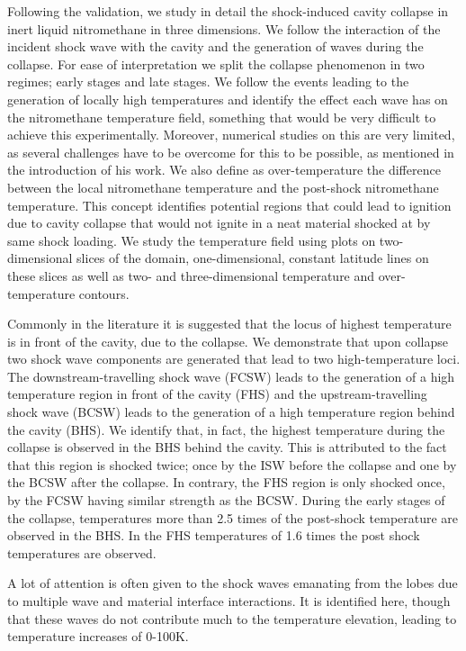 \documentclass[3p,times,twocolumn]{elsarticle}
\begin{document}
Following the validation, we study in detail the shock-induced cavity collapse in inert liquid nitromethane in three dimensions.  We follow the interaction of the incident shock wave with the cavity and the generation of waves during the collapse. For ease of interpretation we split the collapse phenomenon in two regimes; early stages and late stages. We follow the events leading to the generation of locally high temperatures and identify the effect each wave has on the nitromethane temperature field, something that would be very difficult to achieve this experimentally. Moreover, numerical studies on this are very limited, as several challenges have to be overcome for this to be possible, as mentioned in the introduction of his work. We also define as over-temperature the difference between the local nitromethane temperature and the post-shock nitromethane temperature. This concept identifies potential regions that could lead to ignition due to cavity collapse that would not ignite in a neat material shocked at by same shock loading. We study the temperature field using plots on two-dimensional slices of the domain, one-dimensional, constant latitude lines on these slices as well as two- and three-dimensional temperature and over-temperature contours.

Commonly in the literature it is suggested that the locus of highest temperature is in front of the cavity, due to the collapse. We demonstrate that upon collapse two shock wave components are generated that lead to two high-temperature loci. The downstream-travelling shock wave (FCSW) leads to the generation of a high temperature region in front of the cavity (FHS) and the upstream-travelling shock wave (BCSW) leads to the generation of a high temperature region behind the cavity (BHS). We identify that, in fact, the highest temperature during the collapse is observed in the BHS behind the cavity. This is attributed to the fact that this region is shocked twice; once by the ISW before the collapse and one by the BCSW after the collapse. In contrary, the FHS region is only shocked once, by the FCSW having similar strength as the BCSW. During the early stages of the collapse, temperatures more than 2.5 times of the post-shock temperature are observed in the BHS. In the FHS temperatures of 1.6 times the post shock temperatures are observed. 

A lot of attention is often given to the shock waves emanating from the lobes due to multiple wave and material interface interactions. It is identified here, though that these waves do not contribute much to the temperature elevation, leading to temperature increases of 0-100K.
\end{document}
